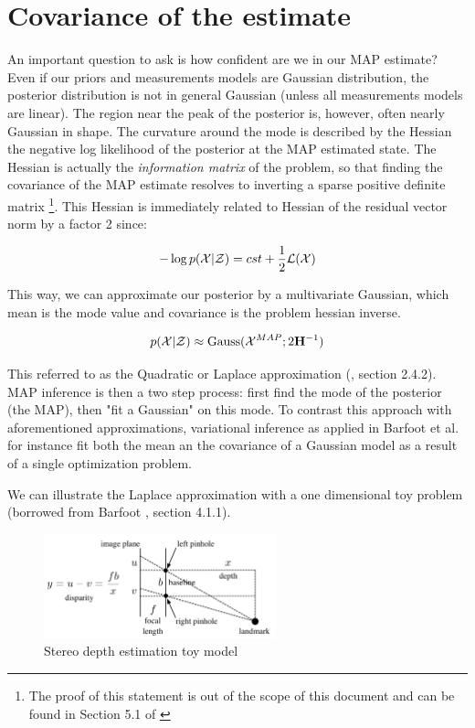 \section{Covariance of the estimate}

An important question to ask is how confident are we in our MAP estimate? Even if our priors and measurements models are Gaussian distribution, the posterior distribution
is not in general Gaussian (unless all measurements models are linear). The region near the peak of the posterior is, however, often nearly Gaussian in shape.
The curvature around the mode is described by the Hessian the negative log likelihood of the posterior at the MAP estimated state. 
The Hessian is actually the \textit{information matrix} of the problem, so that finding the covariance of the MAP estimate resolves to inverting a 
sparse positive definite matrix \footnote{The proof of this statement is out of the scope of this document and can be found in Section 5.1 of 
\cite{peng2018advanced}}. This Hessian is immediately related to Hessian of the residual vector norm by a factor 2 since:

\begin{equation*}
    -\log p(\mathcal{X}|\mathcal{Z}) = cst + \frac{1}{2}\mathcal{L}(\mathcal{X})
\end{equation*}

This way, we can approximate our posterior by a multivariate Gaussian, which mean is the mode value and covariance 
is the problem hessian inverse. 

\begin{equation}
    p(\mathcal{X} | \mathcal{Z}) \approx \text{Gauss}(\mathcal{X}^{MAP}; 2{\bf H}^{-1})
    \label{eq:map_laplace}
\end{equation}

This referred to as the Quadratic or Laplace approximation (\cite{mcelreath2018statistical}, section 2.4.2). MAP inference is then a two step process: 
first find the mode of the posterior (the MAP), then "fit a Gaussian" on this mode. 
To contrast this approach with aforementioned approximations, variational inference as applied in Barfoot et al. 
 \cite{barfoot2020exactly} for instance fit both the mean an the covariance of a Gaussian model as a result of a single optimization problem.

 We can illustrate the Laplace approximation with a one dimensional toy problem (borrowed from Barfoot \cite{barfoot2017state}, section 4.1.1).

 \begin{figure}[h]
    \centering
    \includegraphics[width=0.6\textwidth]{figures/barfoot_stereo.png}
    \caption{Stereo depth estimation toy model \cite{barfoot2017state}}
    \label{fig:barfoot_stereo}
 \end{figure}

